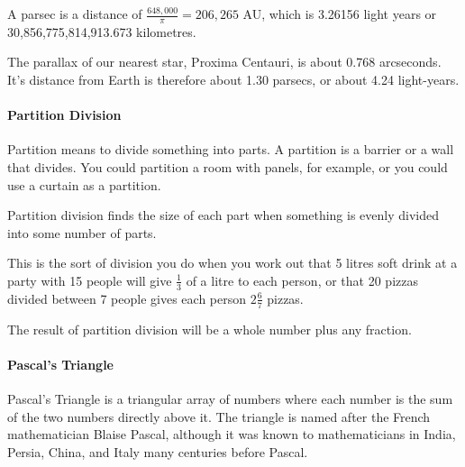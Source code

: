 \documentclass[12pt]{article}
\begin{document}
{A parsec is a distance of $\frac{648,000}{\pi}=206,265$ AU, which is 3.26156 light years or 30,856,775,814,913.673 kilometres.

The parallax of our nearest star, Proxima Centauri, is about 0.768 arcseconds. It's distance from Earth is therefore about 1.30 parsecs, or about 4.24 light-years.

\paragraph{Partition Division}

Partition means to divide something into parts. A partition is a barrier or a wall that divides. You could partition a room with panels, for example, or you could use a curtain as a partition.

Partition division finds the size of each part when something is evenly divided into some number of parts.

This is the sort of division you do when you work out that 5 litres soft drink at a party with 15 people will give $\frac{1}{3}$ of a litre to each person, or that 20 pizzas divided between 7 people gives each person $2 \frac{6}{7}$ pizzas.

The result of partition division will be a whole number plus any fraction.

\paragraph{Pascal's Triangle}
Pascal's Triangle is a triangular array of numbers where each number is the sum of the two numbers directly above it. The triangle is named after the French mathematician Blaise Pascal, although it was known to mathematicians in India, Persia, China, and Italy many centuries before Pascal.
\begin{center}
\end{center}}
\end{document}
